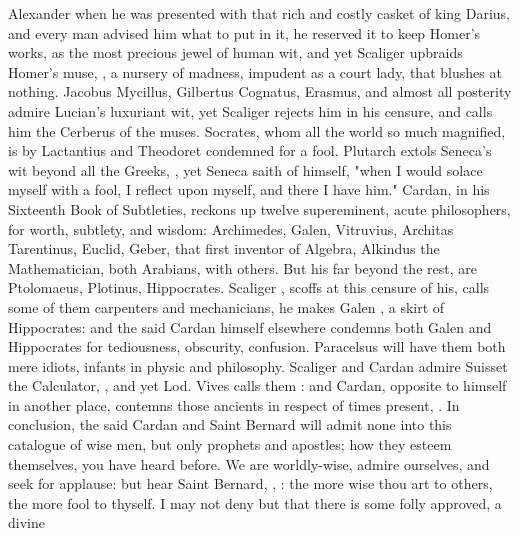 Alexander when he was presented with that rich and costly casket of king
Darius, and every man advised him what to put in it, he reserved it to keep
Homer's works, as the most precious jewel of human wit, and yet
Scaliger upbraids Homer's muse, , a nursery of madness, impudent as a court
lady, that blushes at nothing. Jacobus Mycillus, Gilbertus Cognatus, Erasmus,
and almost all posterity admire Lucian's luxuriant wit, yet Scaliger rejects
him in his censure, and calls him the Cerberus of the muses. Socrates, whom all
the world so much magnified, is by Lactantius and Theodoret condemned for a
fool. Plutarch extols Seneca's wit beyond all the Greeks, ,
yet Seneca saith of himself, "when I would solace myself
with a fool, I reflect upon myself, and there I have him." Cardan, in his
Sixteenth Book of Subtleties, reckons up twelve supereminent, acute
philosophers, for worth, subtlety, and wisdom: Archimedes, Galen, Vitruvius,
Architas Tarentinus, Euclid, Geber, that first inventor of Algebra, Alkindus
the Mathematician, both Arabians, with others. But his 
far beyond the rest, are Ptolomaeus, Plotinus, Hippocrates. Scaliger
, scoffs at this censure of his, calls
some of them carpenters and mechanicians, he makes Galen , a skirt of Hippocrates: and the said Cardan
himself elsewhere condemns both Galen and Hippocrates for tediousness,
obscurity, confusion. Paracelsus will have them both mere idiots, infants in
physic and philosophy. Scaliger and Cardan admire Suisset the Calculator,
, and yet Lod.
Vives calls them : and Cardan, opposite to himself in
another place, contemns those ancients in respect of times present,
. In conclusion, the said Cardan and Saint
Bernard will admit none into this catalogue of wise men,
but only prophets and apostles; how they esteem themselves,
you have heard before. We are worldly-wise, admire ourselves, and seek for
applause: but hear Saint Bernard, , \etc{} : the more wise thou art to others, the more
fool to thyself. I may not deny but that there is some folly approved, a divine
